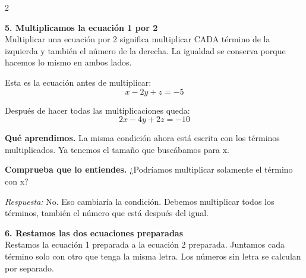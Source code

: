 \documentclass[11pt,a4paper,landscape]{article}
\begin{document}
\begin{multicols*}{2}
\begin{minipage}{\linewidth}
\end{minipage}\par\medskip
\noindent\begin{minipage}{\linewidth}\textbf{5. Multiplicamos la ecuación 1 por 2}\\[2pt]Multiplicar una ecuación por 2 significa multiplicar CADA término de la izquierda y también el número de la derecha. La igualdad se conserva porque hacemos lo mismo en ambos lados.
\par\smallskip Esta es la ecuación antes de multiplicar:
\[x - 2y + z = -5\]
\par{}\par\smallskip
\par\smallskip Después de hacer todas las multiplicaciones queda:
\[2x - 4y + 2z = -10\]
\par\smallskip\textbf{Qué aprendimos.} La misma condición ahora está escrita con los términos multiplicados. Ya tenemos el tamaño que buscábamos para x.
\par\smallskip\textbf{Comprueba que lo entiendes.} ¿Podríamos multiplicar solamente el término con x?\par\textit{Respuesta:} No. Eso cambiaría la condición. Debemos multiplicar todos los términos, también el número que está después del igual.
\end{minipage}\par\medskip
\noindent\begin{minipage}{\linewidth}\textbf{6. Restamos las dos ecuaciones preparadas}\\[2pt]Restamos la ecuación 1 preparada a la ecuación 2 preparada. Juntamos cada término solo con otro que tenga la misma letra. Los números sin letra se calculan por separado.

\end{minipage}
\end{multicols*}
\end{document}
